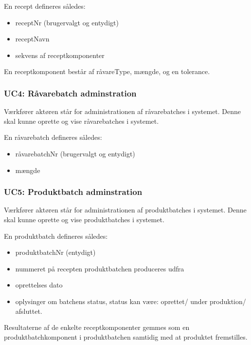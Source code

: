 \documentclass[a4paper]{article}
\begin{document}
En recept defineres således:
\begin{itemize}
  \item receptNr (brugervalgt og entydigt)
  \item receptNavn
  \item sekvens af receptkomponenter
\end{itemize}

En receptkomponent består af råvareType, mængde, og en tolerance.


\subsubsection{UC4: Råvarebatch adminstration} %

Værkfører aktøren står for administrationen af råvarebatches i systemet. Denne skal kunne oprette og vise råvarebatches i systemet. 

En råvarebatch defineres således:

\begin{itemize}
  \item råvarebatchNr (brugervalgt og entydigt)
  \item mængde
\end{itemize}


\subsubsection{UC5: Produktbatch adminstration} %
Værkfører aktøren står for administrationen af produktbatches i systemet. Denne skal kunne oprette og vise produktbatches i systemet.

En produktbatch defineres således:

\begin{itemize}
  \item produktbatchNr (entydigt)
  \item nummeret på recepten produktbatchen produceres udfra
  \item oprettelses dato
  \item oplysinger om batchens status, status kan være: oprettet/ under produktion/ afsluttet.
\end{itemize}

Resultaterne af de enkelte receptkomponenter gemmes som en produktbatchkomponent i produktbatchen samtidig med at produktet fremstilles.
\end{document}
